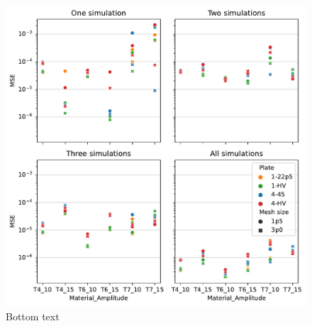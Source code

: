 \begin{figure}
    \centering
    \includegraphics[width=\textwidth]{Chapter/05_results/figures/para_all.pdf}
    \caption{Bottom text}
    \label{fig:para_all}
\end{figure}

